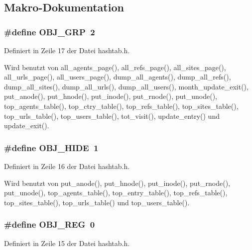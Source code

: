 \subsection{Makro-Dokumentation}
\subsubsection{\setlength{\rightskip}{0pt plus 5cm}\#define OBJ\_\-GRP~2}\label{hashtab_8h_b2fd3e100a904891f4c27eb46e87140f}




Definiert in Zeile 17 der Datei hashtab.h.

Wird benutzt von all\_\-agents\_\-page(), all\_\-refs\_\-page(), all\_\-sites\_\-page(), all\_\-urls\_\-page(), all\_\-users\_\-page(), dump\_\-all\_\-agents(), dump\_\-all\_\-refs(), dump\_\-all\_\-sites(), dump\_\-all\_\-urls(), dump\_\-all\_\-users(), month\_\-update\_\-exit(), put\_\-anode(), put\_\-hnode(), put\_\-inode(), put\_\-rnode(), put\_\-unode(), top\_\-agents\_\-table(), top\_\-ctry\_\-table(), top\_\-refs\_\-table(), top\_\-sites\_\-table(), top\_\-urls\_\-table(), top\_\-users\_\-table(), tot\_\-visit(), update\_\-entry() und update\_\-exit().
\subsubsection{\setlength{\rightskip}{0pt plus 5cm}\#define OBJ\_\-HIDE~1}\label{hashtab_8h_dc29d672dac67a96fe49e055dce78bff}




Definiert in Zeile 16 der Datei hashtab.h.

Wird benutzt von put\_\-anode(), put\_\-hnode(), put\_\-inode(), put\_\-rnode(), put\_\-unode(), top\_\-agents\_\-table(), top\_\-entry\_\-table(), top\_\-refs\_\-table(), top\_\-sites\_\-table(), top\_\-urls\_\-table() und top\_\-users\_\-table().
\subsubsection{\setlength{\rightskip}{0pt plus 5cm}\#define OBJ\_\-REG~0}\label{hashtab_8h_468764de892a2303272613f54f955b0b}




Definiert in Zeile 15 der Datei hashtab.h.


